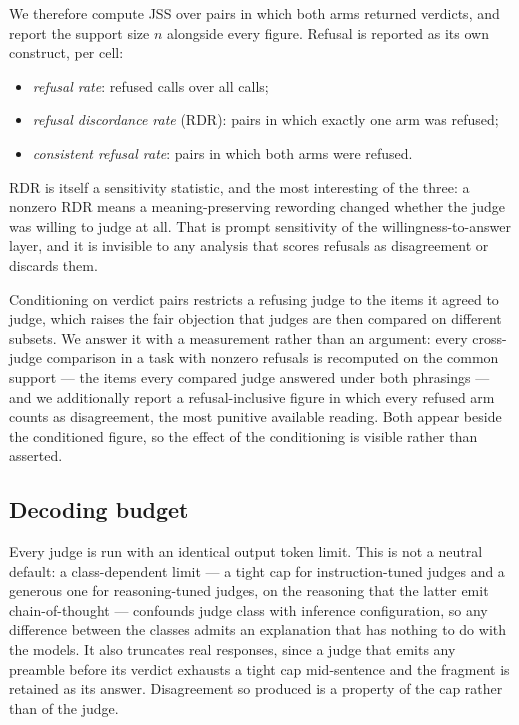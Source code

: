 \documentclass[11pt]{article}          %
\begin{document}
We therefore compute JSS over pairs in which both arms returned verdicts, and
report the support size $n$ alongside every figure. Refusal is reported as its
own construct, per cell:

\begin{itemize}
  \item \emph{refusal rate}: refused calls over all calls;
  \item \emph{refusal discordance rate} (RDR): pairs in which exactly one arm was
    refused;
  \item \emph{consistent refusal rate}: pairs in which both arms were refused.
\end{itemize}

RDR is itself a sensitivity statistic, and the most interesting of the three: a
nonzero RDR means a meaning-preserving rewording changed whether the judge was
willing to judge at all. That is prompt sensitivity of the willingness-to-answer
layer, and it is invisible to any analysis that scores refusals as disagreement
or discards them.

Conditioning on verdict pairs restricts a refusing judge to the items it agreed
to judge, which raises the fair objection that judges are then compared on
different subsets. We answer it with a measurement rather than an argument: every
cross-judge comparison in a task with nonzero refusals is recomputed on the
common support --- the items every compared judge answered under both phrasings
--- and we additionally report a refusal-inclusive figure in which every refused
arm counts as disagreement, the most punitive available reading. Both appear
beside the conditioned figure, so the effect of the conditioning is visible
rather than asserted.

\subsection{Decoding budget}
\label{sec:budget}

Every judge is run with an identical output token limit. This is not a neutral
default: a class-dependent limit --- a tight cap for instruction-tuned judges and
a generous one for reasoning-tuned judges, on the reasoning that the latter emit
chain-of-thought --- confounds judge class with inference configuration, so any
difference between the classes admits an explanation that has nothing to do with
the models. It also truncates real responses, since a judge that emits any
preamble before its verdict exhausts a tight cap mid-sentence and the fragment is
retained as its answer. Disagreement so produced is a property of the cap rather
than of the judge.
\end{document}
